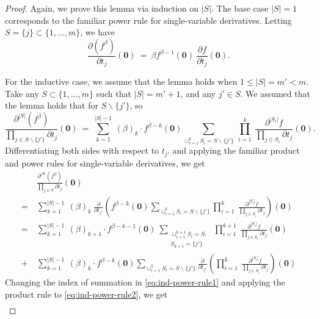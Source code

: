 \documentclass[10pt,a4paper]{amsart}
\begin{document}
\begin{proof}
Again, we prove this lemma via induction on $|S|$. The base case $|S|=1$ corresponds to the familiar power rule for single-variable derivatives. Letting $S=\{j\}\subset\{1,\dots,m\}$, we have
\begin{equation}
    \frac{\partial (f^\beta)}{\partial t_j}(\mathbf{0}) \ = \ \beta f^{\beta-1}(\mathbf{0}) \ \frac{\partial f}{\partial t_j}(\mathbf{0}).
\end{equation}

For the inductive case, we assume that the lemma holds when $1\leq|S|=m'<m$. Take any $S\subset\{1,\dots,m\}$ such that $|S|=m'+1$, and any $j'\in S$. We assumed that the lemma holds that for $S\backslash\{j'\}$, so 
\begin{equation}
\frac{\partial^{|S|} (f^\beta)}{\prod_{j \in S\backslash\{j'\}}\partial t_j}(\mathbf{0}) \ = \ \sum_{k=1}^{|S|-1} \ (\beta)_k \cdot f^{\beta-k}(\mathbf{0})\sum_{\sqcup_{i=1}^k S_i = S\backslash\{j'\}} \ \prod_{i=1}^k \ \frac{\partial^{|S_i|}f}{\prod_{j\in S_i}\partial t_j}(\mathbf{0}).
\end{equation}
Differentiating both sides with respect to $t_{j'}$ and applying the familiar product and power rules for single-variable derivatives, we get
\begin{align}
\nonumber
& \frac{\partial^{|S|} (f^\beta)}{\prod_{j \in S}\partial t_j}(\mathbf{0}) \\
\nonumber
= \ & 
\sum_{k=1}^{|S|-1} \ (\beta)_k \ \frac{\partial}{\partial t_{j'}}\left(f^{\beta-k}(\mathbf{0})\sum_{\sqcup_{i=1}^k S_i = S\backslash\{j'\}} \prod_{i=1}^k \ \frac{\partial^{|S_i|}f}{\prod_{j\in S_i}\partial t_j}\right)(\mathbf{0})\\
\label{eq:ind-power-rule1}
= \ & 
\sum_{k=1}^{|S|-1} \ (\beta)_{k+1} \cdot f^{\beta-k-1}(\mathbf{0}) \ \sum_{\substack{\sqcup_{i=1}^{k+1} S_i = S, \\ S_{k+1}=\{j'\}}} \ \prod_{i=1}^{k+1} \ \frac{\partial^{|S_i|}f}{\prod_{j\in S_i}\partial t_j}(\mathbf{0}) \\
\label{eq:ind-power-rule2}
+ \ & \sum_{k=1}^{|S|-1} \ (\beta)_k \cdot f^{\beta-k}(\mathbf{0})\sum_{\sqcup_{i=1}^k S_i = S\backslash\{j'\}} \frac{\partial}{\partial t_{j'}}\left(\prod_{i=1}^k \ \frac{\partial^{|S_i|}f}{\prod_{j\in S_i}\partial t_j}\right)(\mathbf{0})
\end{align}
Changing the index of summation in \eqref{eq:ind-power-rule1} and applying the product rule to \eqref{eq:ind-power-rule2}, we get
\begin{align}

\end{align}
\end{proof}
\end{document}
